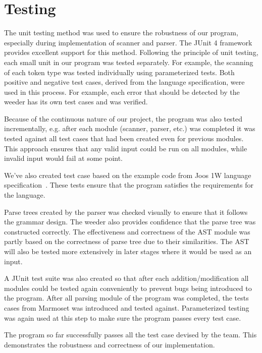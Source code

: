\chapter{Testing}
\label{testing}
The unit testing method was used to ensure the robustness of our program, especially during implementation of scanner and parser. The JUnit 4 framework provides excellent support for this method. Following the principle of unit testing, each small unit in our program was tested separately. For example, the scanning of each token type was tested individually using parameterized tests. Both positive and negative test cases, derived from the language specification, were used in this process. For example, each error that should be detected by the weeder has its own test cases and was verified.

Because of the continuous nature of our project, the program was also tested incrementally, e.g. after each module (scanner, parser, etc.) was completed it was tested against all test cases that had been created even for previous modules. This approach ensures that any valid input could be run on all modules, while invalid input would fail at some point. 

We've also created test case based on the example code from  Joos 1W language specification~\cite{joos1w}. These tests ensure that the program satisfies the requirements for the language. 

Parse trees created by the parser was checked visually to ensure that it follows the grammar design. The weeder also provides confidence that the parse tree was constructed correctly. The effectiveness and correctness of the AST module was partly based on the correctness of parse tree due to their similarities. The AST will also be tested more extensively in later stages where it would be used as an input.

A JUnit test suite was also created so that after each addition/modification all modules could be tested again conveniently to prevent bugs being introduced to the program. After all parsing module of the program was completed, the tests cases from Marmoset was introduced and tested against. Parameterized testing was again used at this step to make sure the program passes every test case.

The program so far successfully passes all the test case devised by the team. This demonstrates the robustness and correctness of our implementation. 
